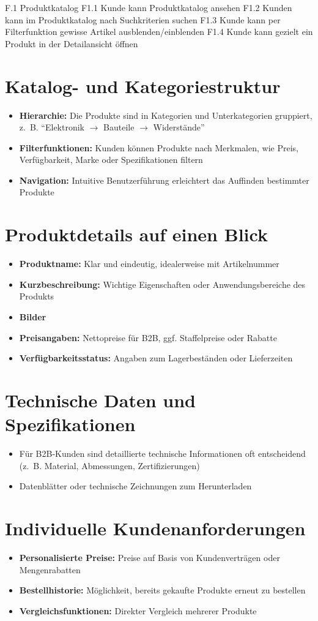 \documentclass[%
	ngerman,
	12pt,
	a4paper,
	oneside,
	parskip=full
]{scrbook}
\begin{document}
F.1 Produktkatalog
F1.1 Kunde kann Produktkatalog ansehen
F1.2 Kunden kann im Produktkatalog nach Suchkriterien suchen
F1.3 Kunde kann per Filterfunktion gewisse Artikel ausblenden/einblenden
F1.4 Kunde kann gezielt ein Produkt in der Detailansicht öffnen


\section{Katalog- und Kategoriestruktur}
\begin{itemize}
	\item \textbf{Hierarchie:} Die Produkte sind in Kategorien und Unterkategorien gruppiert, z.~B. \enquote{Elektronik $\rightarrow$ Bauteile $\rightarrow$ Widerstände}
	\item \textbf{Filterfunktionen:} Kunden können Produkte nach Merkmalen, wie Preis, Verfügbarkeit, Marke oder Spezifikationen filtern
	\item \textbf{Navigation:} Intuitive Benutzerführung erleichtert das Auffinden bestimmter Produkte
\end{itemize}
\section{Produktdetails auf einen Blick}
\begin{itemize}
	\item \textbf{Produktname:} Klar und eindeutig, idealerweise mit Artikelnummer
	\item \textbf{Kurzbeschreibung:} Wichtige Eigenschaften oder Anwendungsbereiche des Produkts
	\item \textbf{Bilder}
	\item \textbf{Preisangaben:} Nettopreise für B2B, ggf. Staffelpreise oder Rabatte
	\item \textbf{Verfügbarkeitsstatus:} Angaben zum Lagerbeständen oder Lieferzeiten
\end{itemize}
\section{Technische Daten und Spezifikationen}
\begin{itemize}
	\item Für B2B-Kunden sind detaillierte technische Informationen oft entscheidend (z.~B. Material, Abmessungen, Zertifizierungen)
	\item Datenblätter oder technische Zeichnungen zum Herunterladen
\end{itemize}
\section{Individuelle Kundenanforderungen}
\begin{itemize}
	\item \textbf{Personalisierte Preise:} Preise auf Basis von Kundenverträgen oder Mengenrabatten
	\item \textbf{Bestellhistorie:} Möglichkeit, bereits gekaufte Produkte erneut zu bestellen
	\item \textbf{Vergleichsfunktionen:} Direkter Vergleich mehrerer Produkte
\end{itemize}
\end{document}
